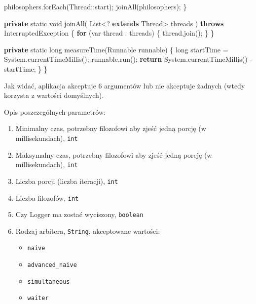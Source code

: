 \documentclass[11pt]{article}
\providecommand{\tightlist}{%
      \setlength{\itemsep}{0pt}\setlength{\parskip}{0pt}}
\newenvironment{Shaded}{}{}
\newcommand{\KeywordTok}[1]{\textcolor[rgb]{0.00,0.44,0.13}{\textbf{{#1}}}}
\newcommand{\DataTypeTok}[1]{\textcolor[rgb]{0.56,0.13,0.00}{{#1}}}
\newcommand{\FunctionTok}[1]{\textcolor[rgb]{0.02,0.16,0.49}{{#1}}}
\newcommand{\NormalTok}[1]{{#1}}
\newcommand{\ControlFlowTok}[1]{\textcolor[rgb]{0.00,0.44,0.13}{\textbf{{#1}}}}
\newcommand{\OperatorTok}[1]{\textcolor[rgb]{0.40,0.40,0.40}{{#1}}}
\newcommand{\BuiltInTok}[1]{{#1}}
\begin{document}
\begin{Shaded}
\begin{Highlighting}[]
\NormalTok{        philosophers}\OperatorTok{.}\FunctionTok{forEach}\OperatorTok{(}\BuiltInTok{Thread}\OperatorTok{::}\NormalTok{start}\OperatorTok{);}
        \FunctionTok{joinAll}\OperatorTok{(}\NormalTok{philosophers}\OperatorTok{);}
    \OperatorTok{\}}

    \KeywordTok{private} \DataTypeTok{static} \DataTypeTok{void} \FunctionTok{joinAll}\OperatorTok{(}
        \BuiltInTok{List}\OperatorTok{\textless{}?} \KeywordTok{extends} \BuiltInTok{Thread}\OperatorTok{\textgreater{}}\NormalTok{ threads}
    \OperatorTok{)} \KeywordTok{throws} \BuiltInTok{InterruptedException} \OperatorTok{\{}
        \ControlFlowTok{for} \OperatorTok{(}\DataTypeTok{var}\NormalTok{ thread }\OperatorTok{:}\NormalTok{ threads}\OperatorTok{)} \OperatorTok{\{}
\NormalTok{            thread}\OperatorTok{.}\FunctionTok{join}\OperatorTok{();}
        \OperatorTok{\}}
    \OperatorTok{\}}

    \KeywordTok{private} \DataTypeTok{static} \DataTypeTok{long} \FunctionTok{measureTime}\OperatorTok{(}\BuiltInTok{Runnable}\NormalTok{ runnable}\OperatorTok{)} \OperatorTok{\{}
        \DataTypeTok{long}\NormalTok{ startTime }\OperatorTok{=} \BuiltInTok{System}\OperatorTok{.}\FunctionTok{currentTimeMillis}\OperatorTok{();}
\NormalTok{        runnable}\OperatorTok{.}\FunctionTok{run}\OperatorTok{();}
        \ControlFlowTok{return} \BuiltInTok{System}\OperatorTok{.}\FunctionTok{currentTimeMillis}\OperatorTok{()} \OperatorTok{{-}}\NormalTok{ startTime}\OperatorTok{;}
    \OperatorTok{\}}
\OperatorTok{\}}
\end{Highlighting}
\end{Shaded}

Jak widać, aplikacja akceptuje 6 argumentów lub nie akceptuje żadnych
(wtedy korzysta z wartości domyślnych).

Opis poszczególnych parametrów:

\begin{enumerate}
\def\labelenumi{\arabic{enumi}.}
\tightlist
\item
  Minimalny czas, potrzebny filozofowi aby zjeść jedną porcję (w
  millisekundach), \texttt{int}
\item
  Maksymalny czas, potrzebny filozofowi aby zjeść jedną porcję (w
  millisekundach), \texttt{int}
\item
  Liczba porcji (liczba iteracji), \texttt{int}
\item
  Liczba filozofów, \texttt{int}
\item
  Czy Logger ma zostać wyciszony, \texttt{boolean}
\item
  Rodzaj arbitera, \texttt{String}, akceptowane wartości:

  \begin{itemize}
  \tightlist
  \item
    \texttt{naive}
  \item
    \texttt{advanced\_naive}
  \item
    \texttt{simultaneous}
  \item
    \texttt{waiter}
  \end{itemize}
\end{enumerate}
\end{document}
